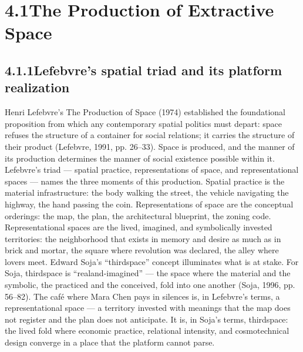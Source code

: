 \section{4.1\quad The Production of Extractive Space}

\subsection{4.1.1\quad Lefebvre’s spatial triad and its platform realization}

Henri Lefebvre’s The Production of Space (1974) established the foundational proposition from which any contemporary spatial politics must depart: space refuses the structure of a container for social relations; it carries the structure of their product (Lefebvre, 1991, pp. 26–33). Space is produced, and the manner of its production determines the manner of social existence possible within it. Lefebvre’s triad — spatial practice, representations of space, and representational spaces — names the three moments of this production. Spatial practice is the material infrastructure: the body walking the street, the vehicle navigating the highway, the hand passing the coin. Representations of space are the conceptual orderings: the map, the plan, the architectural blueprint, the zoning code. Representational spaces are the lived, imagined, and symbolically invested territories: the neighborhood that exists in memory and desire as much as in brick and mortar, the square where revolution was declared, the alley where lovers meet. Edward Soja’s “thirdspace” concept illuminates what is at stake. For Soja, thirdspace is “realand-imagined” — the space where the material and the symbolic, the practiced and the conceived, fold into one another (Soja, 1996, pp. 56–82). The café where Mara Chen pays in silences is, in Lefebvre’s terms, a representational space — a territory invested with meanings that the map does not register and the plan does not anticipate. It is, in Soja’s terms, thirdspace: the lived fold where economic practice, relational intensity, and cosmotechnical design converge in a place that the platform cannot parse.

